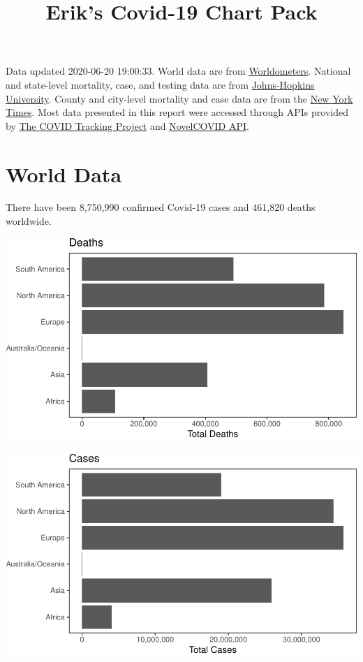 \documentclass[]{article}
\title{Erik's Covid-19 Chart Pack}
\author{}
\date{}
\begin{document}
\maketitle

Data updated 2020-06-20 19:00:33. World data are from
\href{https://github.com/NovelCovid/API}{Worldometers}. National and
state-level mortality, case, and testing data are from
\href{https://covidtracking.com}{Johns-Hopkins University}. County and
city-level mortality and case data are from the
\href{https://github.com/NovelCovid/API}{New York Times}. Most data
presented in this report were accessed through APIs provided by
\href{https://covidtracking.com}{The COVID Tracking Project} and
\href{https://github.com/NovelCovid/API}{NovelCOVID API}.

\hypertarget{world-data}{%
\section{World Data}\label{world-data}}

There have been 8,750,990 confirmed Covid-19 cases and 461,820 deaths
worldwide.

\includegraphics{covid_files/figure-latex/unnamed-chunk-1-1.pdf}

\includegraphics{covid_files/figure-latex/unnamed-chunk-2-1.pdf}
\end{document}
